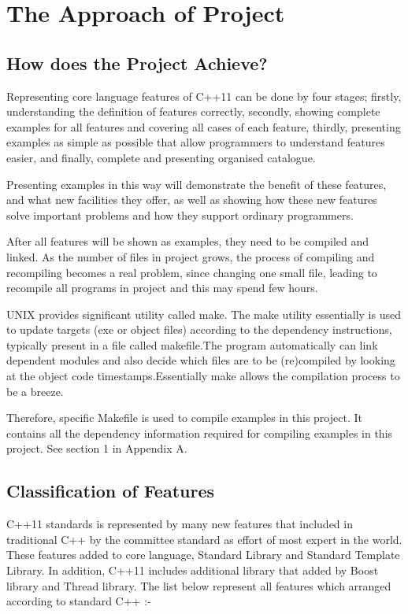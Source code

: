 \documentclass[11pt,]{report}
\begin{document}
\chapter{The Approach of Project}
\section{How does the Project Achieve?}
\label{secton: how does the project achieve?}
Representing core language features of C++11 can be done by four stages; firstly, understanding the definition of features correctly, secondly, showing \linebreak complete examples for all features and covering all cases of each feature, thirdly, presenting examples as simple as possible that allow programmers to understand  features easier, and finally, complete and presenting organised catalogue.

Presenting  examples in this way will  demonstrate the benefit of these \linebreak features, and what new facilities they offer, as well as showing how these new features solve important problems and how they support ordinary programmers.

After all features will be shown as examples, they need to be compiled and linked. As the number of files in project grows, the process of compiling and recompiling becomes a real problem, since changing one small file, leading to recompile all programs in project and this may spend few hours.

UNIX provides significant utility called make. The make utility essentially is used to update targets (exe or object files) according to the \linebreak dependency instructions, typically present in a file called makefile.\linebreak The program automatically can link dependent modules and also decide which files are to be (re)compiled by looking at the object code timestamps.\linebreak Essentially make allows the compilation process to be a breeze.

Therefore, specific Makefile is used to compile examples in this project. It contains all the dependency information required for compiling examples in this project. See section 1 in Appendix A.



\section{Classification of Features}
\label{subsection: overview of features}
C++11 standards is represented by many new features that included in \linebreak traditional C++ by the committee standard as effort of most expert in the world. These features added  to core language, Standard Library and Standard Template Library. In addition, C++11 includes additional library that added by Boost library and Thread library. The list below represent all features which arranged according to standard C++ :-
\end{document}
